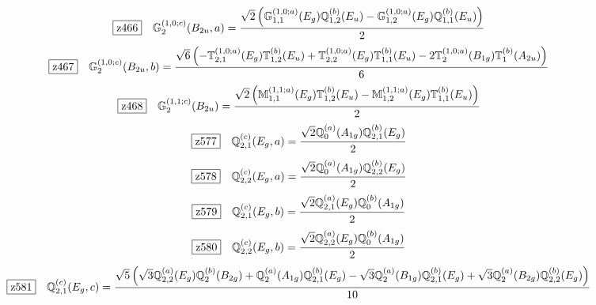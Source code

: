\documentclass[fleqn,10pt,landscape]{jsarticle}
\begin{document}
\begin{dmath*}
\hspace*{3mm}\fbox{z466}\quad \mathbb{G}_{2}^{(1,0;c)}(B_{2u},a)=\frac{\sqrt{2} \left(\mathbb{G}_{1,1}^{(1,0;a)}(E_{g}) \mathbb{Q}_{1,2}^{(b)}(E_{u}) - \mathbb{G}_{1,2}^{(1,0;a)}(E_{g}) \mathbb{Q}_{1,1}^{(b)}(E_{u})\right)}{2}
\end{dmath*}
\begin{dmath*}
\hspace*{3mm}\fbox{z467}\quad \mathbb{G}_{2}^{(1,0;c)}(B_{2u},b)=\frac{\sqrt{6} \left(- \mathbb{T}_{2,1}^{(1,0;a)}(E_{g}) \mathbb{T}_{1,2}^{(b)}(E_{u}) + \mathbb{T}_{2,2}^{(1,0;a)}(E_{g}) \mathbb{T}_{1,1}^{(b)}(E_{u}) - 2 \mathbb{T}_{2}^{(1,0;a)}(B_{1g}) \mathbb{T}_{1}^{(b)}(A_{2u})\right)}{6}
\end{dmath*}
\begin{dmath*}
\hspace*{3mm}\fbox{z468}\quad \mathbb{G}_{2}^{(1,1;c)}(B_{2u})=\frac{\sqrt{2} \left(\mathbb{M}_{1,1}^{(1,1;a)}(E_{g}) \mathbb{T}_{1,2}^{(b)}(E_{u}) - \mathbb{M}_{1,2}^{(1,1;a)}(E_{g}) \mathbb{T}_{1,1}^{(b)}(E_{u})\right)}{2}
\end{dmath*}
\begin{dmath*}
\hspace*{3mm}\fbox{z577}\quad \mathbb{Q}_{2,1}^{(c)}(E_{g},a)=\frac{\sqrt{2} \mathbb{Q}_{0}^{(a)}(A_{1g}) \mathbb{Q}_{2,1}^{(b)}(E_{g})}{2}
\end{dmath*}
\begin{dmath*}
\hspace*{3mm}\fbox{z578}\quad \mathbb{Q}_{2,2}^{(c)}(E_{g},a)=\frac{\sqrt{2} \mathbb{Q}_{0}^{(a)}(A_{1g}) \mathbb{Q}_{2,2}^{(b)}(E_{g})}{2}
\end{dmath*}
\begin{dmath*}
\hspace*{3mm}\fbox{z579}\quad \mathbb{Q}_{2,1}^{(c)}(E_{g},b)=\frac{\sqrt{2} \mathbb{Q}_{2,1}^{(a)}(E_{g}) \mathbb{Q}_{0}^{(b)}(A_{1g})}{2}
\end{dmath*}
\begin{dmath*}
\hspace*{3mm}\fbox{z580}\quad \mathbb{Q}_{2,2}^{(c)}(E_{g},b)=\frac{\sqrt{2} \mathbb{Q}_{2,2}^{(a)}(E_{g}) \mathbb{Q}_{0}^{(b)}(A_{1g})}{2}
\end{dmath*}
\begin{dmath*}
\hspace*{3mm}\fbox{z581}\quad \mathbb{Q}_{2,1}^{(c)}(E_{g},c)=\frac{\sqrt{5} \left(\sqrt{3} \mathbb{Q}_{2,2}^{(a)}(E_{g}) \mathbb{Q}_{2}^{(b)}(B_{2g}) + \mathbb{Q}_{2}^{(a)}(A_{1g}) \mathbb{Q}_{2,1}^{(b)}(E_{g}) - \sqrt{3} \mathbb{Q}_{2}^{(a)}(B_{1g}) \mathbb{Q}_{2,1}^{(b)}(E_{g}) + \sqrt{3} \mathbb{Q}_{2}^{(a)}(B_{2g}) \mathbb{Q}_{2,2}^{(b)}(E_{g})\right)}{10}
\end{dmath*}
\end{document}
